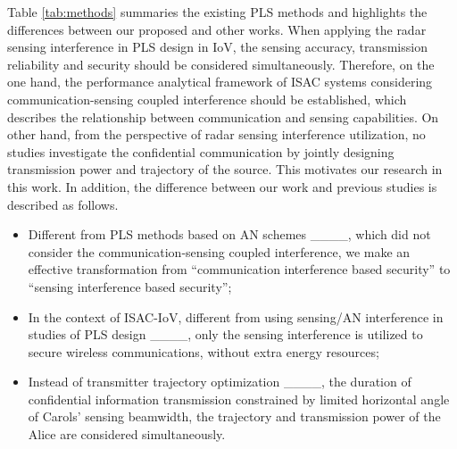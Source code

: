 Table \ref{tab:methods} summaries the existing PLS methods and highlights the differences between our proposed and other works.
When applying the radar sensing interference in PLS design in IoV, the sensing accuracy, transmission reliability and security should be considered simultaneously. Therefore, on the one hand, the performance analytical framework of ISAC systems considering communication-sensing coupled interference should be established, which describes the relationship between communication and sensing capabilities. On other hand, from the perspective of radar sensing interference utilization, no studies investigate the confidential communication by jointly designing transmission power and trajectory of the source.
This motivates our research in this work. 
In addition, the difference between our work and previous studies is described as follows.
\begin{itemize}
  \item Different from PLS methods based on AN schemes ____, which did not consider the communication-sensing coupled interference, we make an effective transformation from ``communication interference based security'' to ``sensing interference based security'';
  \item In the context of ISAC-IoV, different from using sensing/AN interference in studies of PLS design ____, only the sensing interference is utilized to secure wireless communications, without extra energy resources;
  \item Instead of transmitter trajectory optimization ____, the duration of confidential information transmission constrained by limited horizontal angle of Carols' sensing beamwidth, the trajectory and transmission power of the Alice are considered simultaneously.
\end{itemize}
